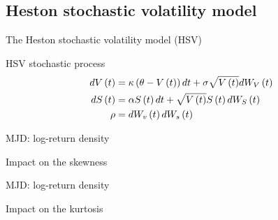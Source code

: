 \documentclass{beamer}
\newcommand{\Bmsub}[1]{W_{#1}\left(t\right)}
\newcommand{\St}{S\left(t\right)}
\newcommand{\Vt}{V\left(t\right)}
\newcommand{\HSVstock}{
  d\St &= \alpha \St dt + \sqrt{\Vt} \St d \Bmsub{S}
}
\newcommand{\HSVvol}{
  d\Vt &= \kappa\left(\theta - \Vt \right) dt + \sigma \sqrt{\Vt} d \Bmsub{V}
}
\begin{document}
\subsection{Heston stochastic volatility model}
\begin{frame}{The Heston stochastic volatility model (HSV)}

\begin{block}{HSV stochastic process}
\begin{align}
    \HSVvol \notag\\
    \HSVstock \notag \\
    \rho  &= d\Bmsub{v} d\Bmsub{s}  \notag
\end{align}
  
\end{block}


\end{frame}


\begin{frame}{MJD: log-return density}

\begin{block}{Impact on the skewness}
\begin{figure}[ht]
\centering

\end{figure}
\end{block}
\end{frame}

\begin{frame}{MJD: log-return density}
\begin{block}{Impact on the kurtosis}
\begin{figure}[ht]
\centering

\end{figure}

\end{block}
 
\end{frame}
\end{document}
